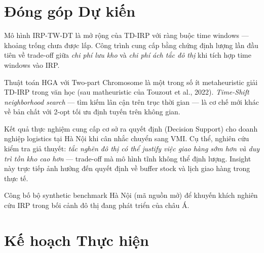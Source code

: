 \documentclass[12pt,a4paper]{article}
\newcommand{\boldterm}[1]{\textbf{\color{primary}#1}}
\begin{document}
\section{Đóng góp Dự kiến}

\begin{description}[leftmargin=0cm, itemsep=8pt]
  \item[\boldterm{Đóng góp lý luận:}]
    Mô hình IRP-TW-DT là mở rộng của TD-IRP \citep{touzout2022assign} với ràng buộc
    time windows --- khoảng trống chưa được lấp. Công trình cung cấp bằng chứng
    định lượng lần đầu tiên về trade-off giữa \textit{chi phí lưu kho} và
    \textit{chi phí ách tắc đô thị} khi tích hợp time windows vào IRP.

  \item[\boldterm{Đóng góp phương pháp:}]
    Thuật toán HGA với Two-part Chromosome là một trong số ít metaheuristic
    giải TD-IRP trong văn học (sau matheuristic của Touzout et al., 2022).
    \textit{Time-Shift neighborhood search} --- tìm kiếm lân cận trên trục thời gian ---
    là cơ chế mới khác về bản chất với 2-opt tối ưu định tuyến trên không gian.

  \item[\boldterm{Đóng góp thực tiễn:}]
    Kết quả thực nghiệm cung cấp cơ sở ra quyết định (Decision Support) cho doanh
    nghiệp logistics tại Hà Nội khi cân nhắc chuyển sang VMI. Cụ thể, nghiên cứu
    kiểm tra giả thuyết: \textit{tắc nghẽn đô thị có thể justify việc giao hàng sớm
    hơn và duy trì tồn kho cao hơn} --- trade-off mà mô hình tĩnh không thể định
    lượng. Insight này trực tiếp ảnh hưởng đến quyết định về buffer stock và
    lịch giao hàng trong thực tế.

  \item[\boldterm{Đóng góp dữ liệu:}]
    Công bố bộ synthetic benchmark Hà Nội (mã nguồn mở) để khuyến khích nghiên cứu
    IRP trong bối cảnh đô thị đang phát triển của châu Á.
\end{description}

\section{Kế hoạch Thực hiện}
\end{document}
